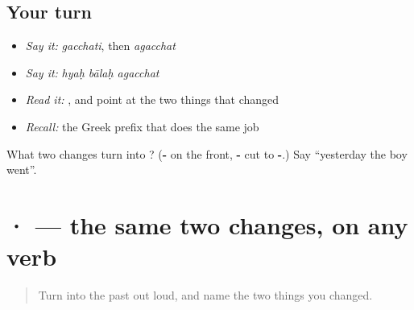 \subsection*{Your turn}
\begin{itemize}
\raggedright
  \item \emph{Say it:} \emph{gacchati}, then \emph{agacchat}
  \item \emph{Say it:} \emph{hyaḥ bālaḥ agacchat}
  \item \emph{Read it:} \textbf{}, and point at the two things that changed
  \item \emph{Recall:} the Greek prefix that does the same job
\end{itemize}

\begin{tcolorbox}[breakable,colback=teal!4,colframe=teal!35!black,title={Before you move on}]
What two changes turn \textbf{} into \textbf{}? (\textbf{-} on the front, \textbf{-} cut to \textbf{-}.) Say \textquotedblleft{}yesterday the boy went\textquotedblright{}.
\end{tcolorbox}
\section[\texorpdfstring{\sk{अपठत्} · \sk{अखादत्} (apaṭhat · akhādat)}{अपठत् · अखादत् (apaṭhat · akhādat)}]{ ·  — the same two changes, on any verb}

\label{lesson:SA-C56-apathat}



\begin{quote}
Turn \textbf{} into the past out loud, and name the two things you changed.
\end{quote}

